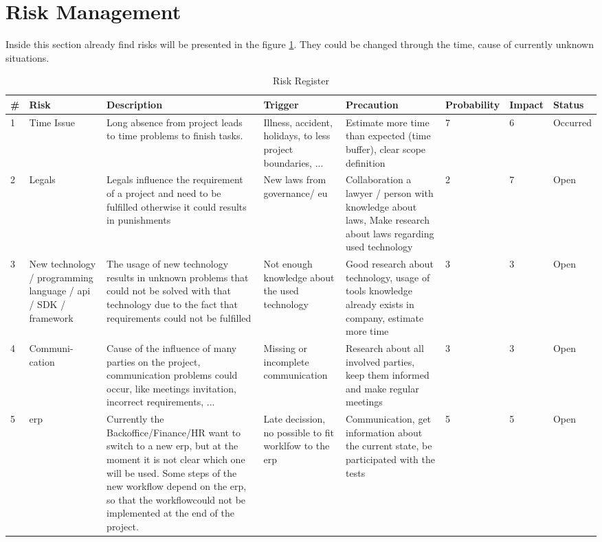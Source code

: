 \section{Risk Management}
Inside this section already find risks will be presented in the figure \ref{fig:risks}. They could be changed through the time, cause of currently unknown situations.
\begin{center}
	\begin{landscape}
		\begin{table}[h]
			\begin{tabular}{|p{}|p{2cm}|p{4cm}|p{4cm}|p{4cm}|p{1,5cm}|p{}|p{}|} \hline
				\rowcolor{Gray} \# & Risk & Description & Trigger & Precaution & Probability & Impact & Status \\ \hline
				1 & Time Issue & Long absence from project leads to time problems to finish tasks. & Illness, accident, holidays, to less project boundaries, ... & Estimate more time than expected (time buffer), clear scope definition & 7 & 6 & Occurred \\ \hline
				2 & Legals & Legals influence the requirement of a project and need to be fulfilled otherwise it could results in punishments & New laws from governance/ \gls{eu} & Collaboration a lawyer / person with knowledge about laws, Make research about laws regarding used technology & 2 & 7 & Open \\ \hline
				3 & New technology / programming language / \gls{api} / \gls{SDK} / framework & The usage of new technology results	in unknown problems that could not be solved with that technology due to the fact that requirements could not be fulfilled & Not enough knowledge about 	the used technology & Good research about technology, usage of tools knowledge already exists in company, estimate more time & 3 & 3 & Open \\ \hline
				4 & Communi- cation & Cause of the influence of many parties on the project, communication problems could occur, like meetings invitation, incorrect requirements, ... & Missing or incomplete communication & Research about all involved parties, keep them informed and make regular meetings & 3 & 3 & Open \\ \hline
				5 & \gls{erp} & Currently the Backoffice/Finance/HR	want to switch to a new \gls{erp},
				but at the moment it is not clear which	one will be used. Some steps of	the new workflow depend on the \gls{erp}, so that the workflowcould not be implemented at the end	of the project. & Late decission, no possible to fit worklfow to the \gls{erp} & Communication, get information about the current state, be participated with the tests & 5 & 5 & Open \\ \hline
			\end{tabular}
			\caption{Risk Register}
			\label{fig:risks}
		\end{table}
	\end{landscape}
\end{center}
